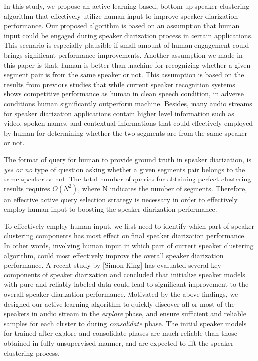 \documentclass[journal]{IEEEtran}
\begin{document}
In this study, we propose an active learning based, bottom-up speaker clustering algorithm that effectively utilize human input to improve speaker diarization performance. Our proposed algorithm is based on an assumption that human input could be engaged during speaker diarization process in certain applications. This scenario is especially plausible if small amount of human engagement could brings significant performance improvements. Another assumption we made in this paper is that, human is better than machine for recognizing whether a given segment pair is from the same speaker or not. This assumption is based on the results from previous studies that while current speaker recognition systems shows competitive performance as human in clean speech condition, in adverse conditions human significantly outperform machine. Besides, many audio streams for speaker diarization applications contain higher level information such as video, spoken names, and contextual informations that could effectively employed by human for determining whether the two segments are from the same speaker or not.

The format of query for human to provide ground truth in speaker diarization, is \textit{yes or no} type of question asking whether a given segments pair belongs to the same speaker or not. The total number of queries for obtaining perfect clustering results requires $O(N^{2})$, where N indicates the number of segments. Therefore, an effective active query selection strategy is necessary in order to effectively employ human input to boosting the speaker diarization performance. 

To effectively employ human input, we first need to identify which part of speaker clustering components has most effect on final speaker diarization performance. In other words, involving human input in which part of current speaker clustering algorithm, could most effectively improve the overall speaker diarization performance. A recent study by [Simon King] has evaluated several key components of speaker diarization and concluded that initialize speaker models with pure and reliably labeled data could lead to significant improvement to the overall speaker diarization performance.   Motivated by the above findings, we designed our active learning algorithm to quickly discover all or most of the speakers in audio stream in the \textit{explore} phase, and ensure sufficient and reliable samples for each cluster to during \textit{consolidate} phase. The initial speaker models for trained after explore and consolidate phases are much reliable than those obtained in fully unsupervised manner, and are expected to lift the speaker clustering process.
\end{document}
